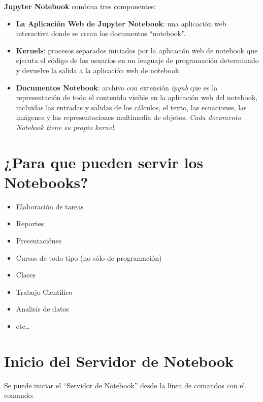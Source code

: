 \documentclass[11pt]{article}
\providecommand{\tightlist}{%
      \setlength{\itemsep}{0pt}\setlength{\parskip}{0pt}}
\begin{document}
\textbf{Jupyter Notebook} combina tres componentes:

\begin{itemize}
\tightlist
\item
  \textbf{La Aplicación Web de Jupyter Notebook}: una aplicación web
  interactiva donde se crean los documentos ``notebook''.
\item
  \textbf{Kernels}: procesos separados iniciados por la aplicación web
  de notebook que ejecuta el código de los usuarios en un lenguaje de
  programación determinado y devuelve la salida a la aplicación web de
  notebook.
\item
  \textbf{Documentos Notebook}: archivo con extensión \emph{ipynb} que
  es la representación de todo el contenido visible en la aplicación web
  del notebook, incluidas las entradas y salidas de los cálculos, el
  texto, las ecuaciones, las imágenes y las representaciones multimedia
  de objetos. \emph{Cada documento Notebook tiene su propio kernel}.
\end{itemize}

    \hypertarget{para-que-pueden-servir-los-notebooks}{%
\section{¿Para que pueden servir los
Notebooks?}\label{para-que-pueden-servir-los-notebooks}}

\begin{itemize}
\tightlist
\item
  Elaboración de tareas
\item
  Reportes
\item
  Presentaciónes
\item
  Cursos de todo tipo (no sólo de programación)
\item
  Clases
\item
  Trabajo Científico
\item
  Analisis de datos
\item
  etc\ldots{}
\end{itemize}

    \hypertarget{inicio-del-servidor-de-notebook}{%
\section{Inicio del Servidor de
Notebook}\label{inicio-del-servidor-de-notebook}}

Se puede iniciar el ``Servidor de Notebook'' desde la línea de comandos
con el comando:
\end{document}
